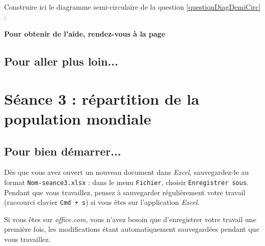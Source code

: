 
Construire ici le diagramme semi-circulaire de la question \ref{questionDiagDemiCirc}   :


\textbf{Pour obtenir de l'aide, rendez-vous à la page \pageref{Tableur5eOutils}}



\subsection{Pour aller plus loin...}

\vfill


\phantom{rien} 




%
%
%
%

\newpage


\section{Séance 3 : répartition de la population mondiale}\label{ficheTableur5e3}

\subsection{Pour bien démarrer...}

Dès que vous avez ouvert un nouveau document dans \emph{Excel}, sauvegardez-le au format \texttt{Nom-seance3.xlsx} : dans le menu \texttt{Fichier}, choisir \texttt{Enregistrer sous}. Pendant que vous travaillez, pensez à sauvegarder régulièrement votre travail (raccourci clavier \texttt{Cmd + s}) si vous êtes sur l'application \emph{Excel}.


Si vous êtes sur \emph{office.com}, vous n'avez besoin que d'enregistrer votre travail une première fois, les modifications étant automatiquement sauvegardées pendant que vous travaillez.

